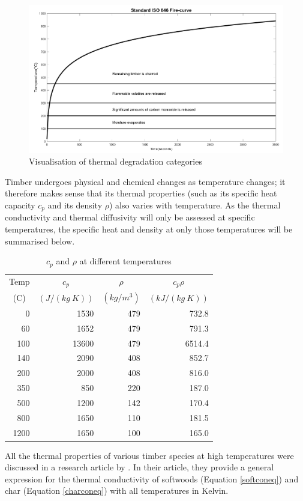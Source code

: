 \begin{figure}
\centering
\includegraphics[width = \textwidth]{figures/iso_phases.png}
\caption{Visualisation of thermal degradation categories}
\label{fig:iso_phases}
\end{figure}

Timber undergoes physical and chemical changes as temperature changes; it therefore makes sense that its thermal properties (such as its specific heat capacity $c_p$ and its density $\rho$) also varies with temperature.
As the thermal conductivity and thermal diffusivity will only be assessed at specific temperatures, the specific heat and density  at only those temperatures will be summarised below.
\begin{table}
\centering
\caption{$c_p$ and $\rho$ at different temperatures}
\label{cptab}
	\begin{tabular}{ r r r r }
	\toprule
	\multicolumn{1}{c}{Temp}& \multicolumn{1}{c}{$c_p$}& \multicolumn{1}{c}{$\rho$} & \multicolumn{1}{c}{$c_p\rho$}\\
	\multicolumn{1}{c}{ (\textdegree C)} & \multicolumn{1}{c}{$ (J/ (kg\ K))$} &  \multicolumn{1}{c}{$ (kg/m^3)$} & \multicolumn{1}{c}{$ (kJ/ (kg\ K))$}\\
	\midrule
	0   & 1530 & 479&732.8\\
	60  &1652	& 479&791.3\\
	100 &13600& 479&6514.4\\
 	140 &2090 &408&852.7\\
	200 & 2000&408&816.0\\
	350 & 850 &220&187.0\\
	500 & 1200 &142&170.4\\
	800 & 1650&110&181.5\\
	1200& 1650 &100&165.0\\
	\bottomrule
	\end{tabular}
	
\end{table}
All the thermal properties of various timber species at high temperatures were discussed in a research article by \citet{Shi:2021}.
 In their article, they provide a general expression for the thermal conductivity of softwoods  (Equation \ref{softconeq}) and char  (Equation \ref{charconeq}) with all temperatures in Kelvin.


